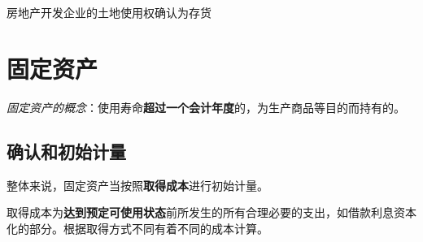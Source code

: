 \documentclass[UTF8,12pt]{ctexart}
\numberwithin{equation}{section} %
\numberwithin{figure}{section}
\numberwithin{table}{section}
\begin{document}
	房地产开发企业的土地使用权确认为存货
	
	\newpage
	\section{固定资产}
	\textit{固定资产的概念}：使用寿命\textbf{超过一个会计年度}的，为生产商品等目的而持有的。
	
	\subsection{确认和初始计量}
	
	整体来说，固定资产当按照\textbf{取得成本}进行初始计量。
	
	取得成本为\textbf{达到预定可使用状态}前所发生的所有合理必要的支出，如借款利息资本化的部分。根据取得方式不同有着不同的成本计算。
	
\end{document}
